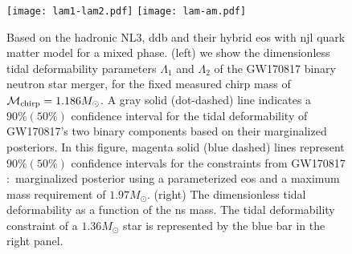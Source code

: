 \documentclass[a4paper, 11pt]{article}
\begin{document}
\begin{figure}
\centering
\texttt{[image: lam1-lam2.pdf]}
\texttt{[image: lam-am.pdf]}
\caption{Based on the hadronic NL3, \ac{ddb} and their hybrid \ac{eos} with \ac{njl} quark matter model for a mixed phase. (left) we show the dimensionless tidal deformability parameters $\Lambda_1$ and $\Lambda_2$ of the GW170817 binary neutron star merger, for the fixed measured chirp mass of $\mathcal{M}_{\rm chirp} = 1.186 M_{\odot}$. A gray solid (dot-dashed) line indicates a $90 \%(50 \%)$ confidence interval for the tidal deformability of GW170817's two binary components based on their marginalized posteriors. In this figure, magenta solid (blue dashed) lines represent $90\%(50\%)$ confidence intervals for the constraints from GW170817 $:$ marginalized posterior using a parameterized \ac{eos} and a maximum mass requirement of $1.97M_{\odot}$. (right) The dimensionless tidal deformability as a function of the \ac{ns} mass. The tidal deformability constraint of a $1.36M_{\odot}$ star is represented by the blue bar in the right panel.}
\label{figure:lam-am}
\end{figure}
\end{document}
